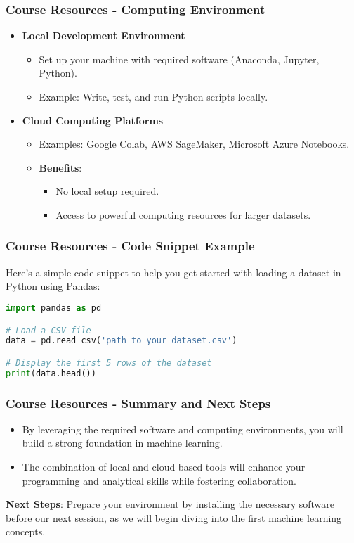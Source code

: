 \documentclass[aspectratio=169]{beamer}
\begin{document}
\begin{frame}[fragile]
    \frametitle{Course Resources - Computing Environment}
    \begin{itemize}
        \item \textbf{Local Development Environment}
            \begin{itemize}
                \item Set up your machine with required software (Anaconda, Jupyter, Python).
                \item Example: Write, test, and run Python scripts locally.
            \end{itemize}
        \item \textbf{Cloud Computing Platforms}
            \begin{itemize}
                \item Examples: Google Colab, AWS SageMaker, Microsoft Azure Notebooks.
                \item \textbf{Benefits}:
                    \begin{itemize}
                        \item No local setup required.
                        \item Access to powerful computing resources for larger datasets.
                    \end{itemize}
            \end{itemize}
    \end{itemize}
\end{frame}

\begin{frame}[fragile]
    \frametitle{Course Resources - Code Snippet Example}
    Here's a simple code snippet to help you get started with loading a dataset in Python using Pandas:
    \begin{lstlisting}[language=Python]
import pandas as pd

# Load a CSV file
data = pd.read_csv('path_to_your_dataset.csv')

# Display the first 5 rows of the dataset
print(data.head())
    \end{lstlisting}
\end{frame}

\begin{frame}
    \frametitle{Course Resources - Summary and Next Steps}
    \begin{itemize}
        \item By leveraging the required software and computing environments, you will build a strong foundation in machine learning.
        \item The combination of local and cloud-based tools will enhance your programming and analytical skills while fostering collaboration.
    \end{itemize}
    \textbf{Next Steps}: Prepare your environment by installing the necessary software before our next session, as we will begin diving into the first machine learning concepts.
\end{frame}
\end{document}
